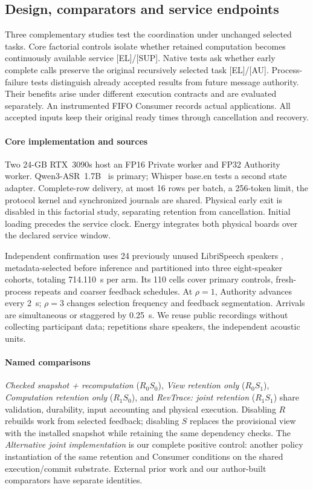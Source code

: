 \subsection{Design, comparators and service endpoints}
Three complementary studies test the coordination under unchanged
selected tasks. Core factorial controls isolate whether retained
computation becomes continuously available service [EL]/[SUP]. Native
tests ask whether early complete calls preserve the original recursively
selected task [EL]/[AU]. Process-failure tests distinguish already
accepted results from future message authority. Their benefits arise
under different execution contracts and are evaluated separately.
An instrumented FIFO Consumer records actual applications. All accepted
inputs keep their original ready times through cancellation and recovery.

\paragraph{Core implementation and sources}
Two 24-GB RTX~3090s host an FP16 Private worker and FP32 Authority worker.
Qwen3-ASR~1.7B~\cite{shi2026qwen3asr} is primary; Whisper base.en
\cite{radford2023whisper} tests a second state adapter. Complete-row
delivery, at most 16 rows per batch, a 256-token limit, the protocol kernel
and synchronized journals are shared. Physical early exit is disabled
in this factorial study, separating retention from cancellation.
Initial loading precedes the service clock. Energy integrates both
physical boards over the declared service window.

Independent confirmation uses 24 previously unused LibriSpeech speakers
\cite{panayotov2015librispeech}, metadata-selected before inference and
partitioned into three eight-speaker cohorts, totaling 714.110~s per arm.
Its 110 cells cover primary controls, fresh-process repeats and coarser
feedback schedules. At $\rho=1$, Authority advances every 2~s;
$\rho=3$ changes selection frequency and feedback segmentation. Arrivals
are simultaneous or staggered by 0.25~s. We reuse public recordings without
collecting participant data; repetitions share speakers, the independent
acoustic units.

\paragraph{Named comparisons}
\emph{Checked snapshot + recomputation} ($R_0S_0$), \emph{View retention
only} ($R_0S_1$), \emph{Computation retention only} ($R_1S_0$), and
\emph{RevTrace: joint retention} ($R_1S_1$) share validation, durability,
input accounting and physical execution. Disabling $R$ rebuilds work
from selected feedback; disabling $S$ replaces the provisional view
with the installed snapshot while retaining the same dependency checks.
The \emph{Alternative joint implementation} is our complete positive
control: another policy instantiation of the same retention and Consumer
conditions on the shared execution/commit substrate. External prior work
and our author-built comparators have separate identities.

